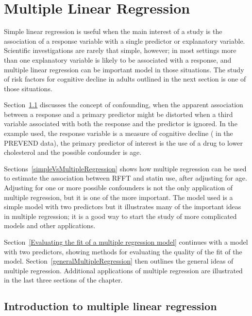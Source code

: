 
\chapter{Multiple Linear Regression}
\label{multipleLinearRegression}



Simple linear regression is useful when the main interest of a study is the association of a response variable with a single predictor or explanatory variable.  Scientific investigations are rarely that simple, however; in most settings more than one explanatory variable is likely to be associated with a response, and multiple linear regression can be important model in those situations.  The study of risk factors for cognitive decline in adults outlined in the next section is one of those situations.

Section~\ref{introductionMultipleLinearRegression} discusses the concept
of confounding, when the apparent association between a response and a
primary predictor might be distorted when a third variable associated
with both the response and the predictor is ignored.  In the example
used, the response variable is a measure of cognitive decline
( in the PREVEND data), the primary predictor of interest is
the use of a drug to lower cholesterol and the possible confounder is
age. 

Sections~\ref{simpleVsMultipleRegression} shows how multiple regression
can be used to estimate the association between RFFT and statin use,
after adjusting for age.  Adjusting for one or more possible confounders
is not the only application of multiple regression, but it is one of the
more important.   The model used is a simple model with two predictors
but it illustrates many of the important ideas in multiple regression;
it is a good way to start the study of more complicated models and other
applications.

Section~\ref{Evaluating the fit of a multiple regression model} continues with a model with two predictors, showing methods for evaluating the quality of the fit of the model. Section~\ref{generalMultipleRegression} then outlines the general ideas of multiple regression.  Additional applications of multiple regression are illustrated in the last three sections of the chapter.

\section{Introduction to multiple linear regression}
\label{introductionMultipleLinearRegression}

